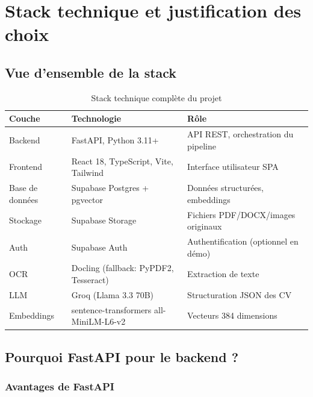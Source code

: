 \documentclass[11pt,a4paper]{report}
\begin{document}
\chapter{Stack technique et justification des choix}

\section{Vue d'ensemble de la stack}

\begin{table}[H]
  \centering
  \caption{Stack technique complète du projet}
  \small
  \begin{tabular}{@{}llp{6cm}@{}}
    \toprule
    \textbf{Couche} & \textbf{Technologie} & \textbf{Rôle} \\
    \midrule
    Backend & FastAPI, Python 3.11+ & API REST, orchestration du pipeline \\
    Frontend & React 18, TypeScript, Vite, Tailwind & Interface utilisateur SPA \\
    Base de données & Supabase Postgres + pgvector & Données structurées, embeddings \\
    Stockage & Supabase Storage & Fichiers PDF/DOCX/images originaux \\
    Auth & Supabase Auth & Authentification (optionnel en démo) \\
    OCR & Docling (fallback: PyPDF2, Tesseract) & Extraction de texte \\
    LLM & Groq (Llama 3.3 70B) & Structuration JSON des CV \\
    Embeddings & sentence-transformers all-MiniLM-L6-v2 & Vecteurs 384 dimensions \\
    \bottomrule
  \end{tabular}
\end{table}

\section{Pourquoi FastAPI pour le backend ?}

\subsection{Avantages de FastAPI}
\end{document}
